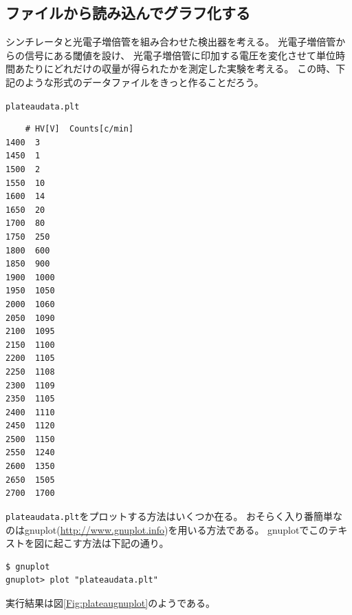 \documentclass{jarticle}
\begin{document}
\subsection{ファイルから読み込んでグラフ化する}
シンチレータと光電子増倍管を組み合わせた検出器を考える。
光電子増倍管からの信号にある閾値を設け、
光電子増倍管に印加する電圧を変化させて単位時間あたりにどれだけの収量が得られたかを測定した実験を考える。
この時、下記のような形式のデータファイルをきっと作ることだろう。
 \begin{itembox}{\texttt{plateaudata.plt}}
\begin{verbatim}
	# HV[V]  Counts[c/min]
1400  3
1450  1
1500  2
1550  10
1600  14
1650  20
1700  80
1750  250
1800  600
1850  900
1900  1000
1950  1050
2000  1060
2050  1090
2100  1095
2150  1100
2200  1105
2250  1108
2300  1109
2350  1105
2400  1110
2450  1120
2500  1150
2550  1240
2600  1350
2650  1505
2700  1700
\end{verbatim}
 \end{itembox}
\verb|plateaudata.plt|をプロットする方法はいくつか在る。
おそらく入り番簡単なのはgnuplot(\url{http://www.gnuplot.info})を用いる方法である。
gnuplotでこのテキストを図に起こす方法は下記の通り。
\begin{verbatim}
$ gnuplot
gnuplot> plot "plateaudata.plt"
\end{verbatim}

実行結果は図\ref{Fig:plateaugnuplot}のようである。
\end{document}
